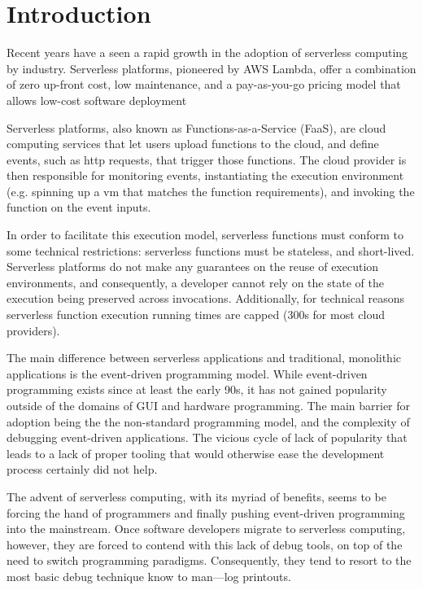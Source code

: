 \section{Introduction}

Recent years have a seen a rapid growth in the adoption of serverless computing
by industry. Serverless platforms, pioneered by AWS Lambda, offer a combination
of zero up-front cost, low maintenance, and a pay-as-you-go pricing model that
allows low-cost software deployment %

Serverless platforms, also known as Functions-as-a-Service (FaaS), are cloud
computing services that let users upload functions to the cloud, and define
events, such as http requests, that trigger those functions. The cloud provider
is then responsible for monitoring events, instantiating the execution
environment (e.g. spinning up a vm that matches the function requirements), and
invoking the function on the event inputs. 

In order to facilitate this execution model, serverless functions must conform
to some technical restrictions: serverless functions must be stateless, and
short-lived. Serverless platforms do not make any guarantees on the reuse of
execution environments, and consequently, a developer cannot rely on the state
of the execution being preserved across invocations. Additionally, for technical
reasons serverless function execution running times are capped (300s for most
cloud providers).

The main difference between serverless applications and traditional, monolithic
applications is the event-driven programming model. While event-driven
programming exists since at least the early 90s, it has not gained popularity
outside of the domains of GUI and hardware programming. The main barrier for
adoption being the the non-standard programming model, and the complexity of
debugging event-driven applications. The vicious cycle of lack of popularity
that leads to a lack of proper tooling that would otherwise ease the development
process certainly did not help.

The advent of serverless computing, with its myriad of benefits, seems to be
forcing the hand of programmers and finally pushing event-driven programming
into the mainstream. Once software developers migrate to serverless computing,
however, they are forced to contend with this lack of debug tools, on top of the
need to switch programming paradigms. Consequently, they tend to resort to the
most basic debug technique know to man---log printouts.

